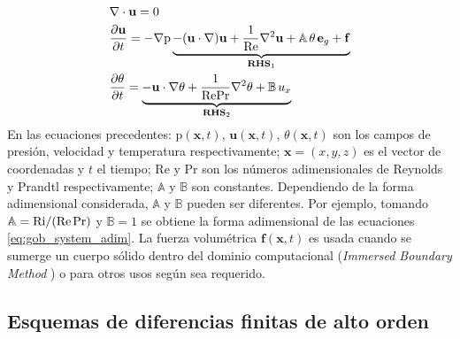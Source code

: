 \begin{equation}
\begin{aligned}
&\nabla \cdot \mathbf{u} = 0 \\
& \frac{\partial \mathbf{u}}{\partial t} = -\nabla \text{p} \underbrace{- (\mathbf{u} \cdot \nabla)\mathbf{u} + \frac{1}{\text{Re}} \nabla^2 \mathbf{u} + \mathbb{A} \hspace{0.5mm} \theta \hspace{0.5mm} \mathbf{e}_g + \mathbf{f} }_{\textbf{RHS}_{1}} \\
& \frac{\partial \theta}{\partial t} = \underbrace{- \mathbf{u} \cdot \nabla \theta + \frac{1}{\text{Re} \text{Pr}} \nabla^2 \theta + \mathbb{B} \hspace{0.5mm} u_x }_{\textbf{RHS}_2} \\
\end{aligned}
\label{eq:sistem2}
\end{equation}
En las ecuaciones precedentes: $\text{p}(\mathbf{x},t)$, $\mathbf{u}(\mathbf{x},t)$, $\theta(\mathbf{x},t)$
son los campos de presión, velocidad y temperatura respectivamente; $\mathbf{x} = (x,y,z)$ es el vector de coordenadas y $t$ el tiempo; Re y Pr son los números adimensionales de Reynolds y Prandtl respectivamente; $\mathbb{A}$ y $\mathbb{B}$ son constantes. Dependiendo de la forma adimensional considerada, $\mathbb{A}$ y $\mathbb{B}$ pueden ser diferentes. Por ejemplo, tomando $\mathbb{A}=\text{Ri} / (\text{Re} \hspace{0.5mm} \text{Pr})$ y $\mathbb{B}=1$  se obtiene la forma adimensional de las ecuaciones \ref{eq:gob_system_adim}. La fuerza volumétrica $\mathbf{f}(\mathbf{x},t)$ es usada cuando se sumerge un cuerpo sólido dentro del dominio computacional (\textit{Immersed Boundary Method} \cite{peskin2002immersed}) o para otros usos según sea requerido.


\subsection{Esquemas de diferencias finitas de alto orden}

